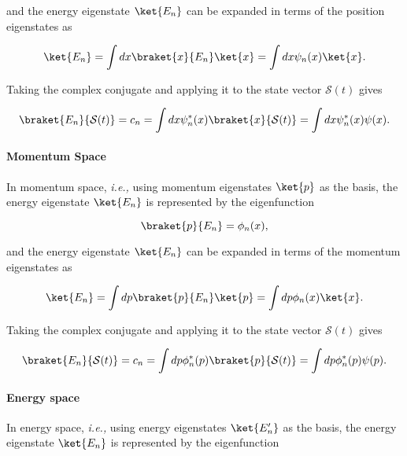 \documentclass[a4paper,12pt]{report}
\begin{document}
and the energy eigenstate \(\ket{E_{n} } \) can be expanded in terms of the position eigenstates as 

\begin{equation}
  \ket{E_{n} } = \int dx \braket{x}{E_{n} } \ket{x} = \int dx \psi _{n}(x) \ket{x}.      
\end{equation}

Taking the complex conjugate and applying it to the state vector \(\mathcal{S}(t)\) gives 

\begin{equation}
  \braket{E_{n} }{\mathcal{S}(t)} = c_{n} = \int dx \psi _{n}^*(x) \braket{x}{\mathcal{S}(t)} = \int dx \psi _{n}^*(x)\psi (x).    
\end{equation}



\paragraph{Momentum Space}

In momentum space, \textit{i.e.,} using momentum eigenstates \(\ket{p} \) as the basis, the energy eigenstate \(\ket{E_{n} } \) is represented by the eigenfunction

\begin{equation}
  \braket{p}{E_{n} } = \phi _{n}(x),
\end{equation}

and the energy eigenstate \(\ket{E_{n} } \) can be expanded in terms of the momentum eigenstates as

\begin{equation}
  \ket{E_{n} } = \int dp \braket{p}{E_{n} } \ket{p} = \int dp \phi  _{n}(x) \ket{x}.      
\end{equation}

Taking the complex conjugate and applying it to the state vector \(\mathcal{S}(t)\) gives 

\begin{equation}
  \braket{E_{n} }{\mathcal{S}(t)} = c_{n} = \int dp \phi _{n}^*(p) \braket{p}{\mathcal{S}(t)} = \int dp \phi _{n}^*(p)\psi (p).    
\end{equation}

\paragraph{Energy space}

In energy space, \textit{i.e.,} using energy eigenstates \(\ket{E_{n} '} \) as the basis, the energy eigenstate \(\ket{E_{n} } \) is represented by the eigenfunction 
\end{document}
